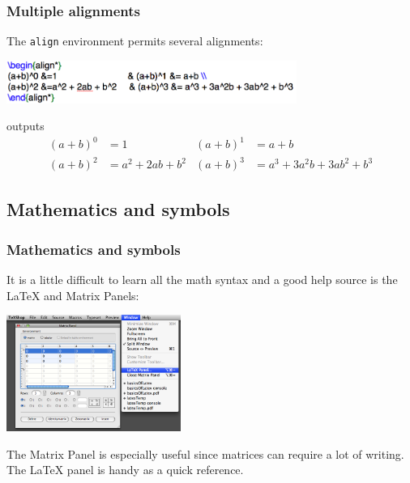 \begin{frame} \frametitle{Multiple alignments}
The \texttt{\color{highlight}align} environment permits several alignments:
\begin{center}
\includegraphics[height=14mm]{math/alignMany}
\end{center}
outputs
\begin{align*}
(a+b)^0 &=1                            & (a+b)^1 &= a+b \\
(a+b)^2 &=a^2 + 2ab + b^2     & (a+b)^3 &= a^3 + 3a^2b + 3ab^2 + b^3
\end{align*}
\end{frame}

\subsection[Mathematics and symbols]{Mathematics and symbols}

\begin{frame} \frametitle{Mathematics and symbols}
It is a little difficult to learn all the math syntax and a good help source is the LaTeX and Matrix Panels:
\begin{center}
\includegraphics[height=1.5in]{math/panels}
\end{center}
The Matrix Panel is especially useful since matrices can require a lot of writing. The LaTeX panel is handy as a quick reference.
\end{frame}


